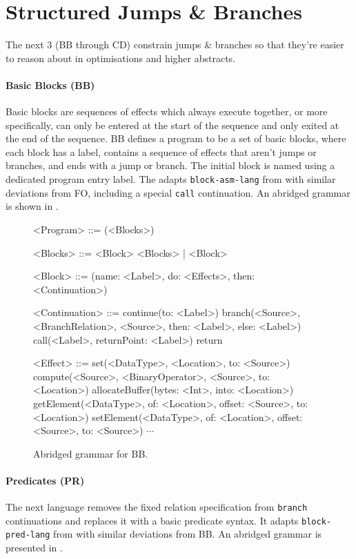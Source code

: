 \documentclass[main.tex]{subfiles}
\begin{document}
\section{Structured Jumps \& Branches}
The next 3 \ils{} (BB through CD) constrain jumps \& branches so that they're easier to reason about in optimisations and higher abstracts.

\paragraph{Basic Blocks (BB)} Basic blocks are sequences of effects which always execute together, or more specifically, can only be entered at the start of the sequence and only exited at the end of the sequence. BB defines a program to be a set of basic blocks, where each block has a label, contains a sequence of effects that aren't jumps or branches, and ends with a jump or branch. The initial block is named using a dedicated program entry label. The \il{} adapts \texttt{block-asm-lang} from \cite{:compcourse} with similar deviations from FO, including a special \texttt{call} continuation. An abridged grammar is shown in .

\begin{figure}[ht]
	\begin{grammar}
		
		<Program> ::= (<Blocks>)
		
		<Blocks> ::= <Block> <Blocks> | <Block>
		
		<Block> ::= (name: <Label>, do: <Effects>, then: <Continuation>)
		
		<Continuation> ::= continue(to: <Label>)
			\alt branch(<Source>, <BranchRelation>, <Source>, then: <Label>, else: <Label>)
			\alt call(<Label>, returnPoint: <Label>)
			\alt return
		
		<Effect> ::= set(<DataType>, <Location>, to: <Source>)
			\alt compute(<Source>, <BinaryOperator>, <Source>, to: <Location>)
			\alt allocateBuffer(bytes: <Int>, into: <Location>)
			\alt getElement(<DataType>, of: <Location>, offset: <Source>, to: <Location>)
			\alt setElement(<DataType>, of: <Location>, offset: <Source>, to: <Source>)
			\alt $\cdots$
		
	\end{grammar}
	\caption{Abridged grammar for BB.}
	\label{bnf:bb}
\end{figure}

\paragraph{Predicates (PR)} The next language removes the fixed relation specification from \texttt{branch} continuations and replaces it with a basic predicate syntax. It adapts \texttt{block-pred-lang} from \cite{:compcourse} with similar deviations from BB. An abridged grammar is presented in .
\end{document}
